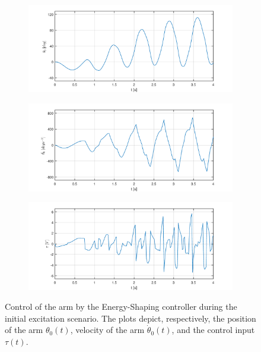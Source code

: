 \begin{figure}[H]
	\centering
\begin{subfigure}
	\centering
	\includegraphics[scale=0.6]{images/swings/arm.pdf}  
\end{subfigure}
\begin{subfigure}
	\centering
	\includegraphics[scale=0.6]{images/swings/darm.pdf}  
\end{subfigure}
\begin{subfigure}
	\centering
	\includegraphics[scale=0.6]{images/swings/control.pdf} 
\end{subfigure}
	\caption{Control of the arm by the Energy-Shaping controller during the initial excitation scenario. The plots depict, respectively, the position of the arm $\theta_0(t)$, velocity of the arm $\dot{\theta}_0(t)$, and the control input $\tau(t)$.}
\label{swing}
\end{figure}
